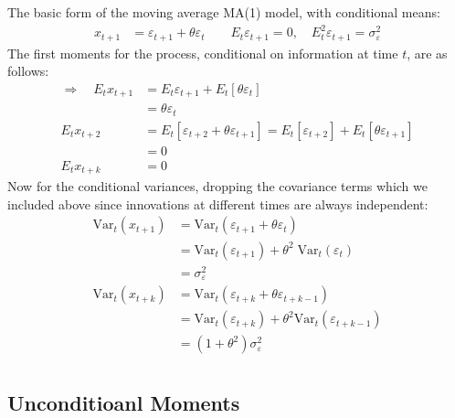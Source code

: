 \documentclass[a4paper,12pt]{scrartcl}
\begin{document}
The basic form of the moving average MA(1) model, with conditional 
means:
\begin{align*}
    x_{t+1} &= \varepsilon_{t+1} + \theta \varepsilon_t  
    \qquad E_t \varepsilon_{t+1} = 0, \quad 
	E^2_t \varepsilon_{t+1} = \sigma^2_\varepsilon
\end{align*}
The first moments for the process, conditional on information 
at time $t$, are as follows:
\begin{align*}
    \Rightarrow \quad E_t x_{t+1} &= E_t\varepsilon_{t+1} + E_{t} [\theta \varepsilon_t ]\\
		&= \theta \varepsilon_t \\
    E_t x_{t+2} &= E_t[ \varepsilon_{t+2}  + \theta \varepsilon_{t+1} ] 
	= E_t[\varepsilon_{t+2}] + E_t[ \theta \varepsilon_{t+1} ] \\
    &= 0 \\
    E_t x_{t+k} &= 0
\end{align*}
Now for the conditional variances, dropping the covariance terms
which we included above
since innovations at different times are always independent:
\begin{align*}
    \text{Var}_t(x_{t+1}) &= \text{Var}_t(\varepsilon_{t+1} +
	\theta \varepsilon_t) \\
	&= \text{Var}_t(\varepsilon_{t+1}) 
	    + \theta^2 \; \text{Var}_t(\varepsilon_t)  \\
	&= \sigma_\varepsilon^2 \\
    \text{Var}_t(x_{t+k}) &= 
	\text{Var}_t(\varepsilon_{t+k} + \theta \varepsilon_{t+k-1}) \\
	&=  \text{Var}_t(\varepsilon_{t+k}) 
	    + \theta^2 \text{Var}_t(\varepsilon_{t+k-1}) \\
	&=  (1 + \theta^2) \sigma_\varepsilon^2 \\
\end{align*}
   
\newpage
\subsection{Unconditioanl Moments}
\end{document}
